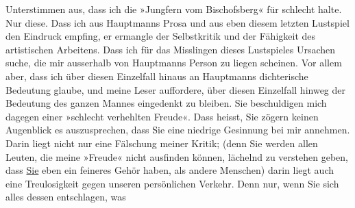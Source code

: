 \begin{ledgroupsized}[t]{13cm}
               Unterstimmen aus, dass ich die »Jungfern vom
                  Bischofsberg« für schlecht halte. Nur diese. Dass ich aus Hauptmanns Prosa und aus eben diesem letzten Lustspiel den Eindruck empfing, er ermangle
               der Selbstkritik und der Fähigkeit des artistischen Arbeitens. Dass ich für das
               Misslingen dieses Lustspieles
               Ursachen suche, die mir ausserhalb von Hauptmanns Person zu liegen scheinen. Vor allem aber, dass ich über diesen
               Einzelfall hinaus an Hauptmanns dichterische
               Bedeutung glaube, und meine Leser auffordere, über diesen Einzelfall hinweg der
               Bedeutung des ganzen Mannes
               eingedenkt zu bleiben.\pend
           \pstart
           Sie beschuldigen mich dagegen einer »schlecht verhehlten Freude«. Dass heisst, Sie
               zögern keinen Augenblick es auszusprechen, dass Sie eine
               niedrige Gesinnung bei mir annehmen. Darin liegt nicht nur eine Fälschung meiner
               Kritik; (denn Sie werden allen Leuten, die meine »Freude« nicht ausfinden können,
               lächelnd zu verstehen geben, dass \uline{Sie} eben ein
               feineres Gehör haben, als andere Menschen) darin liegt auch eine Treulosigkeit gegen
               unseren persönlichen Verkehr. Denn nur, wenn Sie sich alles dessen entschlagen, was

\end{ledgroupsized}
